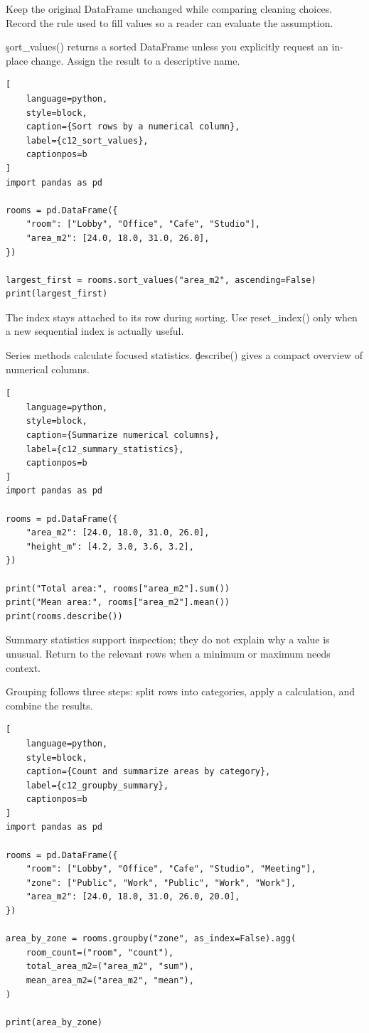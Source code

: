 Keep the original DataFrame unchanged while comparing cleaning choices. Record
the rule used to fill values so a reader can evaluate the assumption.


\c{sort_values()} returns a sorted DataFrame unless you explicitly request an
in-place change. Assign the result to a descriptive name.

\begin{lstlisting}[
    language=python,
    style=block,
    caption={Sort rows by a numerical column},
    label={c12_sort_values},
    captionpos=b
]
import pandas as pd

rooms = pd.DataFrame({
    "room": ["Lobby", "Office", "Cafe", "Studio"],
    "area_m2": [24.0, 18.0, 31.0, 26.0],
})

largest_first = rooms.sort_values("area_m2", ascending=False)
print(largest_first)
\end{lstlisting}

The index stays attached to its row during sorting. Use \c{reset_index()} only
when a new sequential index is actually useful.


Series methods calculate focused statistics. \c{describe()} gives a compact
overview of numerical columns.

\begin{lstlisting}[
    language=python,
    style=block,
    caption={Summarize numerical columns},
    label={c12_summary_statistics},
    captionpos=b
]
import pandas as pd

rooms = pd.DataFrame({
    "area_m2": [24.0, 18.0, 31.0, 26.0],
    "height_m": [4.2, 3.0, 3.6, 3.2],
})

print("Total area:", rooms["area_m2"].sum())
print("Mean area:", rooms["area_m2"].mean())
print(rooms.describe())
\end{lstlisting}

Summary statistics support inspection; they do not explain why a value is
unusual. Return to the relevant rows when a minimum or maximum needs context.


Grouping follows three steps: split rows into categories, apply a calculation,
and combine the results.

\begin{lstlisting}[
    language=python,
    style=block,
    caption={Count and summarize areas by category},
    label={c12_groupby_summary},
    captionpos=b
]
import pandas as pd

rooms = pd.DataFrame({
    "room": ["Lobby", "Office", "Cafe", "Studio", "Meeting"],
    "zone": ["Public", "Work", "Public", "Work", "Work"],
    "area_m2": [24.0, 18.0, 31.0, 26.0, 20.0],
})

area_by_zone = rooms.groupby("zone", as_index=False).agg(
    room_count=("room", "count"),
    total_area_m2=("area_m2", "sum"),
    mean_area_m2=("area_m2", "mean"),
)

print(area_by_zone)
\end{lstlisting}

